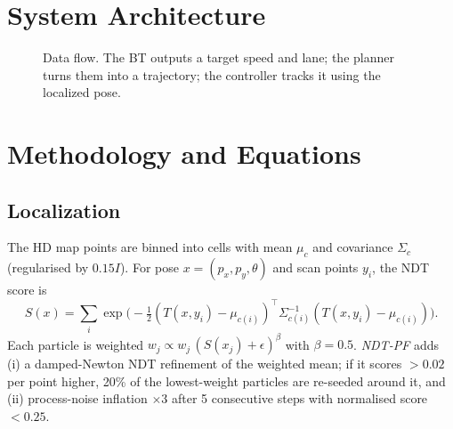 \documentclass[conference]{IEEEtran}
\begin{document}
\section{System Architecture}
\begin{figure}[t]\centering
{}
\caption{Data flow. The BT outputs a target speed and lane; the planner turns them into a trajectory; the controller tracks it using the localized pose.}
\label{fig:arch}\end{figure}

\section{Methodology and Equations}
\subsection{Localization}
The HD map points are binned into cells with mean $\mu_c$ and covariance $\Sigma_c$ (regularised by $0.15I$). For pose $x=(p_x,p_y,\theta)$ and scan points $y_i$, the NDT score is
\begin{equation}S(x)=\sum_i \exp\!\big(-\tfrac12 (T(x,y_i)-\mu_{c(i)})^{\!\top}\Sigma_{c(i)}^{-1}(T(x,y_i)-\mu_{c(i)})\big).\end{equation}
Each particle is weighted $w_j\propto w_j\,(S(x_j)+\epsilon)^{\beta}$ with $\beta=0.5$. \emph{NDT-PF} adds (i) a damped-Newton NDT refinement of the weighted mean; if it scores $>0.02$ per point higher, 20\% of the lowest-weight particles are re-seeded around it, and (ii) process-noise inflation $\times3$ after 5 consecutive steps with normalised score $<0.25$.
\end{document}
